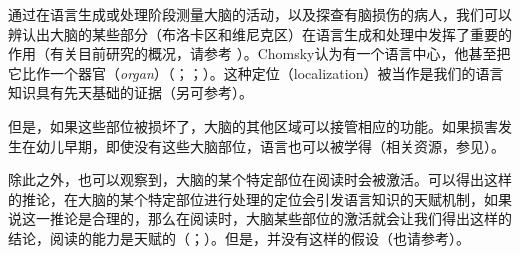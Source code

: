 通过在语言生成或处理阶段测量大脑的活动，以及探查有脑损伤的病人，我们可以辨认出大脑的某些部分（布洛卡区和维尼克区）在语言生成和处理中发挥了重要的作用（有关目前研究的概况，请参考 ）。Chomsky认为有一个语言中心，他甚至把它比作一个器官（\emph{organ}）（\citealp[]{Chomsky77c-u}；\citealp[]{Chomsky2005a}；\citealp[]{Chomsky2008a}）。这种定位（localization）被当作是我们的语言知识具有先天基础的证据（另可参考\citealp[--314]{Pinker94a}）。

但是，如果这些部位被损坏了，大脑的其他区域可以接管相应的功能。如果损害发生在幼儿早期，即使没有这些大脑部位，语言也可以被学得（相关资源，参见\citealp[\S~4.1]{Dabrowska2004a}）。

除此之外，也可以观察到，大脑的某个特定部位在阅读时会被激活。可以得出这样的推论，在大脑的某个特定部位进行处理的定位会引发语言知识的天赋机制，如果说这一推论是合理的，那么在阅读时，大脑某些部位的激活就会让我们得出这样的结论，阅读的能力是天赋的（\citealp[\page ]{EBJKSPP96a}；\citealp[]{Bishop2002a}）。但是，并没有这样的假设（也请参考\citealp*[]{FHC2005a}）。

